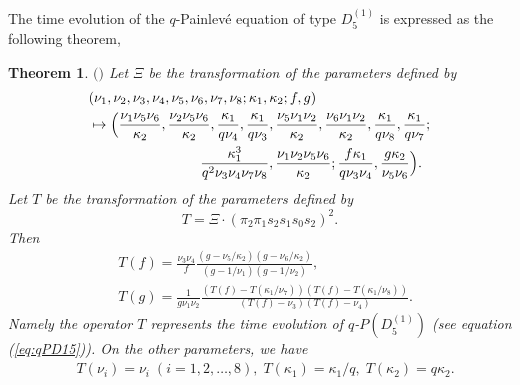 \documentclass[12pt]{amsart}
\numberwithin{equation}{section}
\newtheorem{thm}[prop]{\bf Theorem}
\theoremstyle{definition}
\begin{document}
The time evolution of the $q$-Painlev\'e equation of type $D^{(1)}_5 $ is expressed as the following theorem,
\begin{thm}  $($\cite[Theorem 2.1 (i)]{TsqP}$)$ \label{thm:D5TW} 
Let $\Xi $ be the transformation of the parameters defined by
\begin{align}
& (\nu_1 , \nu_2 , \nu_3 , \nu_4 ,\nu_5 ,\nu_6 , \nu_7 ,\nu_8 ;\kappa_1 ,\kappa_2 ; f ,g) \label{eq:D5Xi} \\
&  \mapsto \Bigl( \frac{\nu _1 \nu_ 5 \nu_6 }{ \kappa_2 } , \frac{\nu _2 \nu_ 5 \nu_6}{\kappa_2} , \frac{\kappa_1 }{q \nu_4 } , \frac{\kappa_1 }{q \nu_3 } ,\frac{\nu _5 \nu_ 1 \nu_2 }{\kappa_2 } ,\frac{\nu _6 \nu_ 1 \nu_2 }{\kappa_2 } , \frac{\kappa_1 }{q \nu_8 } , \frac{\kappa_1 }{q \nu_7 }  ; \nonumber\\
& \qquad \qquad \qquad \qquad \frac{\kappa_1^3}{q^2 \nu_3 \nu_4 \nu_7 \nu_8 } ,\frac{\nu_1 \nu_2 \nu_5 \nu_6 }{\kappa _2 } ; \frac{f \kappa_1}{q \nu_3 \nu_4 } , \frac{g \kappa_2 }{\nu_ 5 \nu_6 } \Bigr) .  \nonumber
\end{align}
Let $T$ be the transformation of the parameters defined by 
\begin{equation}
T= \Xi \cdot (\pi _2 \pi _1 s_2 s_1 s_0 s_2 )^2 .
\end{equation}
Then 
\begin{align}
& T(f)= \frac{ \nu_3 \nu_4  }{ f  } \frac{(g - \nu _5 /\kappa _2 )(g  - \nu _6 /\kappa _2)}{( g -1/\nu_1 )( g -1 /\nu_2 )}, \label{eq:D5TfTg} \\
&  T(g)=  \frac{1}{g \nu_1 \nu_2 }\frac{( T(f) - T(\kappa_1 /\nu_7)) ( T(f) - T(\kappa_1/ \nu_8))}{(T(f) - \nu_3 )(T(f) - \nu_4)}. \nonumber
\end{align}
Namely the operator $T$ represents the time evolution of $q$-$P(D^{(1)}_5)$ (see equation (\ref{eq:qPD15})).
On the other parameters, we have
\begin{align}
& \displaystyle T(\nu _i)= \nu _i \; (i=1,2,\dots ,8) , \;  T(\kappa _1 ) =  \kappa _1  / q , \; T(\kappa _2 ) = q \kappa _2  . \label{eq:D5T}
\end{align}
\end{thm}
\end{document}
